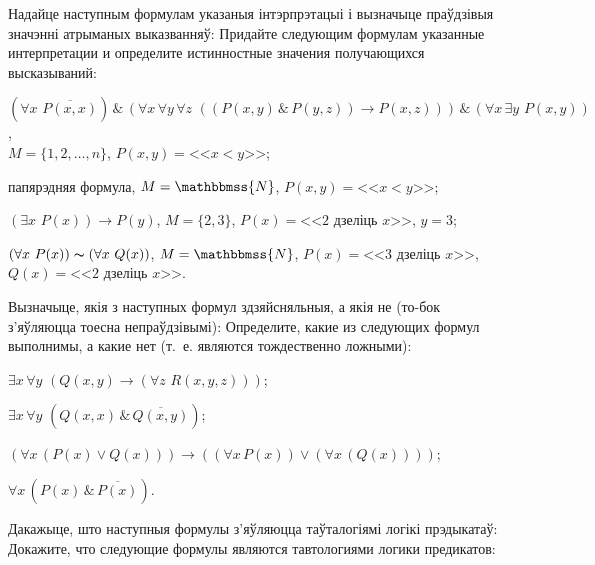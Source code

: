 \begin{problemList}
\bigskip

\problemItemWithCommonPart
{Надайце наступным формулам указаныя інтэрпрэтацыі і вызначыце праўдзівыя значэнні атрыманых выказванняў:}
{Придайте следующим формулам указанные интерпретации и определите
истинностные значения получающихся высказываний:}
{%
\begin{belarusianEnumerate}
	
\item $(\forall x \,\, \overline{P(x, x)}) \,\&\, (\forall x \, \forall y \, \forall z \,\, ((P(x, y) \,\&\, P(y, z)) \to P(x, z))) \,\&\, (\forall x \, \exists y \,\, P(x, y))$, \\ $M = \{1, 2, \ldots, n\}$, $P(x, y) = \text{<<}x < y\text{>>}$;

\item папярэдняя формула, $M = \mathbbmss{N}$, $P(x, y) = \text{<<}x < y\text{>>}$;

\item $(\exists x \,\, P(x)) \to P(y)$, $M=\{2, 3\}$, $P(x) = \text{<<}2 \,\,\text{дзеліць}\,\, x\text{>>}$, $y = 3$;

\item $(\forall x \,\, P(x)) \thicksim (\forall x \,\, Q(x))$, $M = \mathbbmss{N}$, $P(x) = \text{<<}3 \,\,\text{дзеліць}\,\, x\text{>>}$, $Q(x) = \text{<<}2 
\,\,\text{дзеліць}\,\, x\text{>>}$.
	
\end{belarusianEnumerate}
}

\bigskip

\problemItemWithCommonPart
{Вызначыце, якія з наступных формул здзяйсняльныя, а якія не (то-бок з'яўляюцца тоесна непраўдзівымі):}
{Определите, какие из следующих формул выполнимы, а какие нет (т.~е. являются тождественно ложными):}
{%
\begin{belarusianEnumerate}
	
\item $\exists x \, \forall y \,\, (Q(x, y) \to (\forall z \,\, R(x, y, z)))$;
\item $\exists x \, \forall y \,\, (Q(x, x) \,\&\, \overline{Q(x, y)})$;
\item  $(\forall x \, (P(x) \vee Q(x))) \to ((\forall x \, P(x)) \vee (\forall x \, (Q(x))))$;
\item $\forall x \, (P(x) \,\&\, \overline{P(x)})$.

\end{belarusianEnumerate}
}

\bigskip

\problemItemWithCommonPart
{Дакажыце, што наступныя формулы з'яўляюцца таўталогіямі логікі прэдыкатаў:}
{Докажите, что следующие формулы являются тавтологиями логики предикатов:}
{%
\begin{belarusianEnumerate}
	

\end{belarusianEnumerate}}
\end{problemList}
